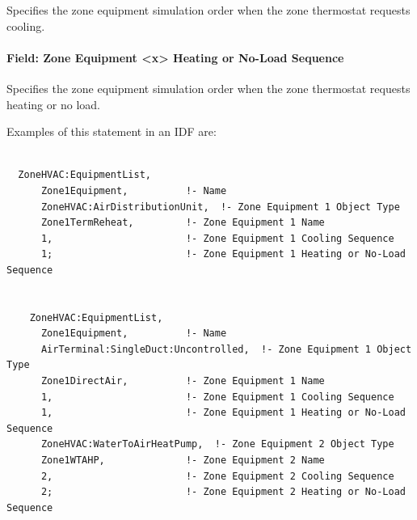 Specifies the zone equipment simulation order when the zone thermostat requests cooling.

\paragraph{Field: Zone Equipment \textless{}x\textgreater{} Heating or No-Load Sequence}\label{field-zone-equipment-x-heating-or-no-load-sequence}

Specifies the zone equipment simulation order when the zone thermostat requests heating or no load.

Examples of this statement in an IDF are:

\begin{lstlisting}

  ZoneHVAC:EquipmentList,
      Zone1Equipment,          !- Name
      ZoneHVAC:AirDistributionUnit,  !- Zone Equipment 1 Object Type
      Zone1TermReheat,         !- Zone Equipment 1 Name
      1,                       !- Zone Equipment 1 Cooling Sequence
      1;                       !- Zone Equipment 1 Heating or No-Load Sequence


    ZoneHVAC:EquipmentList,
      Zone1Equipment,          !- Name
      AirTerminal:SingleDuct:Uncontrolled,  !- Zone Equipment 1 Object Type
      Zone1DirectAir,          !- Zone Equipment 1 Name
      1,                       !- Zone Equipment 1 Cooling Sequence
      1,                       !- Zone Equipment 1 Heating or No-Load Sequence
      ZoneHVAC:WaterToAirHeatPump,  !- Zone Equipment 2 Object Type
      Zone1WTAHP,              !- Zone Equipment 2 Name
      2,                       !- Zone Equipment 2 Cooling Sequence
      2;                       !- Zone Equipment 2 Heating or No-Load Sequence
\end{lstlisting}
